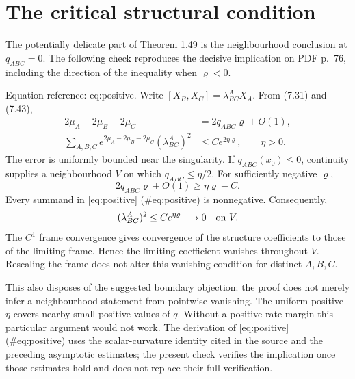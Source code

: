 \documentclass[10pt]{article}
\begin{document}
\section*{The critical structural condition}
The potentially delicate part of Theorem 1.49 is the neighbourhood conclusion at \(q_{ABC}=0\). The following check reproduces the decisive implication on PDF p. 76, including the direction of the inequality when \(\varrho<0\).\par
Equation reference: eq:positive. Write \([X_B,X_C]=\lambda^A_{BC}X_A\). From (7.31) and (7.43), \[\begin{aligned}
 2\mu_A-2\mu_B-2\mu_C&=2q_{ABC}\varrho+O(1),\\
 \sum_{A,B,C}e^{2\mu_A-2\mu_B-2\mu_C}
       (\lambda^A_{BC})^2&\leq C e^{2\eta\varrho},
       \qquad \eta>0. \end{aligned}\] The error is uniformly bounded near the singularity. If \(q_{ABC}(x_0)\leq0\), continuity supplies a neighbourhood \(V\) on which \(q_{ABC}\leq\eta/2\). For sufficiently negative \(\varrho\), \[2q_{ABC}\varrho+O(1)\geq\eta\varrho-C.\] Every summand in [eq:positive] (\#eq:positive) is nonnegative. Consequently, \[(\lambda^A_{BC})^2\leq C e^{\eta\varrho}\longrightarrow0
 \quad\hbox{on }V.\] The \(C^1\) frame convergence gives convergence of the structure coefficients to those of the limiting frame. Hence the limiting coefficient vanishes throughout \(V\). Rescaling the frame does not alter this vanishing condition for distinct \(A,B,C\).\par
This also disposes of the suggested boundary objection: the proof does not merely infer a neighbourhood statement from pointwise vanishing. The uniform positive \(\eta\) covers nearby small positive values of \(q\). Without a positive rate margin this particular argument would not work. The derivation of [eq:positive] (\#eq:positive) uses the scalar-curvature identity cited in the source and the preceding asymptotic estimates; the present check verifies the implication once those estimates hold and does not replace their full verification.\par
\end{document}
